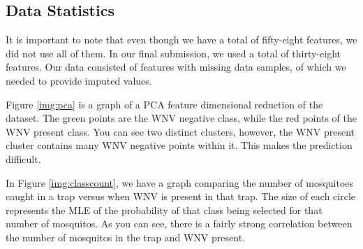 \documentclass{article} %
\begin{document}
\subsection{Data Statistics}
It is important to note that even though we have a total of fifty-eight features, we did not use all of them.  In our final submission, we used a total of thirty-eight features.  Our data consisted of features with missing data samples, of which we needed to provide imputed values. 

Figure \ref{img:pca} is a graph of a PCA feature dimensional reduction of the dataset.  The green points are the WNV negative class, while the red points of the WNV present class.  You can see two distinct clusters, however, the WNV present cluster contains many WNV negative points within it.  This makes the prediction difficult.

In Figure \ref{img:classcount}, we have a graph comparing the number of mosquitoes caught in a trap versus when WNV is present in that trap.  The size of each circle represents the MLE of the probability of that class being selected for that number of mosquitos.  As you can see, there is a fairly strong correlation between the number of mosquitos in the trap and WNV present.
\end{document}
